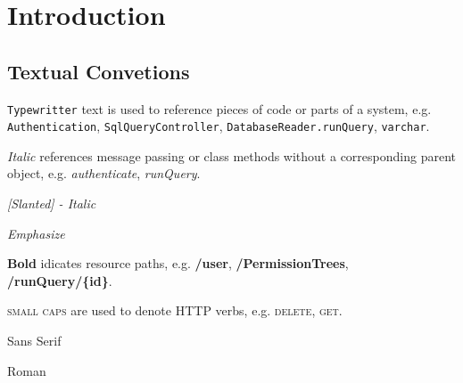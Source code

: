 \chapter{Introduction}

\section{Textual Convetions}

\texttt{Typewritter} text is used to reference pieces of code or parts of a system, e.g. \texttt{Authentication}, \texttt{SqlQueryController}, \texttt{DatabaseReader.runQuery}, \texttt{varchar}.

\textit{Italic}  references message passing or class methods without a corresponding parent object, e.g. \textit{authenticate}, \textit{runQuery}.

\textsl{[Slanted] - Italic}

\emph{Emphasize}

\textbf{Bold} idicates resource paths, e.g. \textbf{/user}, \textbf{/PermissionTrees}, \textbf{/runQuery/\{id\}}.

\textsc{small caps} are used to denote HTTP verbs, e.g. \textsc{delete}, \textsc{get}.

\textsf{Sans Serif}

\textrm{Roman}

